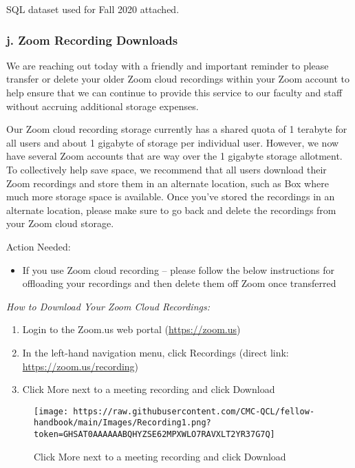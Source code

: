 \documentclass[
]{book}
\providecommand{\tightlist}{%
  \setlength{\itemsep}{0pt}\setlength{\parskip}{0pt}}
\begin{document}
SQL dataset used for Fall 2020 attached.

\hypertarget{j.-zoom-recording-downloads}{%
\subsubsection{\texorpdfstring{j. Zoom Recording Downloads }{j. Zoom Recording Downloads }}\label{j.-zoom-recording-downloads}}

We are reaching out today with a friendly and important reminder to please transfer or delete your older Zoom cloud recordings within your Zoom account to help ensure that we can continue to provide this service to our faculty and staff without accruing additional storage expenses.

Our Zoom cloud recording storage currently has a shared quota of 1 terabyte for all users and about 1 gigabyte of storage per individual user. However, we now have several Zoom accounts that are way over the 1 gigabyte storage allotment. To collectively help save space, we recommend that all users download their Zoom recordings and store them in an alternate location, such as Box where much more storage space is available. Once you've stored the recordings in an alternate location, please make sure to go back and delete the recordings from your Zoom cloud storage.

Action Needed:

\begin{itemize}
\tightlist
\item
  If you use Zoom cloud recording -- please follow the below instructions for offloading your recordings and then delete them off Zoom once transferred
\end{itemize}

\emph{How to Download Your Zoom Cloud Recordings:}

\begin{enumerate}
\def\labelenumi{\arabic{enumi}.}
\item
  Login to the Zoom.us web portal (\url{https://zoom.us})
\item
  In the left-hand navigation menu, click Recordings (direct link: \url{https://zoom.us/recording})
\item
  Click More next to a meeting recording and click Download
\end{enumerate}

\begin{figure}
\centering
\texttt{[image: https://raw.githubusercontent.com/CMC-QCL/fellow-handbook/main/Images/Recording1.png?token=GHSAT0AAAAAABQHYZSE62MPXWLO7RAVXLT2YR37G7Q]}
\caption{Click More next to a meeting recording and click Download}
\end{figure}
\end{document}
